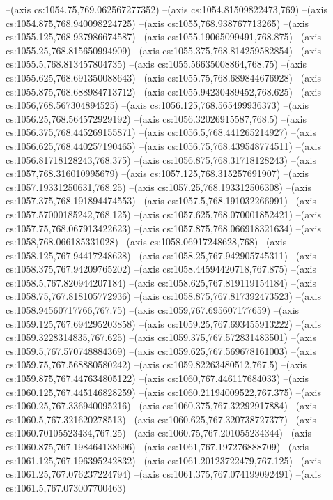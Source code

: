 --(axis cs:1054.75,769.062567277352)
--(axis cs:1054.81509822473,769)
--(axis cs:1054.875,768.940098224725)
--(axis cs:1055,768.938767713265)
--(axis cs:1055.125,768.937986674587)
--(axis cs:1055.19065099491,768.875)
--(axis cs:1055.25,768.815650994909)
--(axis cs:1055.375,768.814259582854)
--(axis cs:1055.5,768.813457804735)
--(axis cs:1055.56635008864,768.75)
--(axis cs:1055.625,768.691350088643)
--(axis cs:1055.75,768.689844676928)
--(axis cs:1055.875,768.688984713712)
--(axis cs:1055.94230489452,768.625)
--(axis cs:1056,768.567304894525)
--(axis cs:1056.125,768.565499936373)
--(axis cs:1056.25,768.564572929192)
--(axis cs:1056.32026915587,768.5)
--(axis cs:1056.375,768.445269155871)
--(axis cs:1056.5,768.441265214927)
--(axis cs:1056.625,768.440257190465)
--(axis cs:1056.75,768.439548774511)
--(axis cs:1056.81718128243,768.375)
--(axis cs:1056.875,768.31718128243)
--(axis cs:1057,768.316010995679)
--(axis cs:1057.125,768.315257691907)
--(axis cs:1057.19331250631,768.25)
--(axis cs:1057.25,768.193312506308)
--(axis cs:1057.375,768.191894474553)
--(axis cs:1057.5,768.191032266991)
--(axis cs:1057.57000185242,768.125)
--(axis cs:1057.625,768.070001852421)
--(axis cs:1057.75,768.067913422623)
--(axis cs:1057.875,768.066918321634)
--(axis cs:1058,768.066185331028)
--(axis cs:1058.06917248628,768)
--(axis cs:1058.125,767.94417248628)
--(axis cs:1058.25,767.942905745311)
--(axis cs:1058.375,767.94209765202)
--(axis cs:1058.44594420718,767.875)
--(axis cs:1058.5,767.820944207184)
--(axis cs:1058.625,767.819119154184)
--(axis cs:1058.75,767.818105772936)
--(axis cs:1058.875,767.817392473523)
--(axis cs:1058.94560717766,767.75)
--(axis cs:1059,767.695607177659)
--(axis cs:1059.125,767.694295203858)
--(axis cs:1059.25,767.693455913222)
--(axis cs:1059.3228314835,767.625)
--(axis cs:1059.375,767.572831483501)
--(axis cs:1059.5,767.570748884369)
--(axis cs:1059.625,767.569678161003)
--(axis cs:1059.75,767.568880580242)
--(axis cs:1059.82263480512,767.5)
--(axis cs:1059.875,767.447634805122)
--(axis cs:1060,767.446117684033)
--(axis cs:1060.125,767.445146828259)
--(axis cs:1060.21194009522,767.375)
--(axis cs:1060.25,767.336940095216)
--(axis cs:1060.375,767.32292917884)
--(axis cs:1060.5,767.321620278513)
--(axis cs:1060.625,767.320738727377)
--(axis cs:1060.70105523434,767.25)
--(axis cs:1060.75,767.201055234344)
--(axis cs:1060.875,767.198464138696)
--(axis cs:1061,767.197276888709)
--(axis cs:1061.125,767.196395242832)
--(axis cs:1061.20123722479,767.125)
--(axis cs:1061.25,767.076237224794)
--(axis cs:1061.375,767.074199092491)
--(axis cs:1061.5,767.073007700463)
